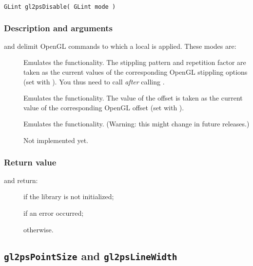 \begin{verbatim}
GLint gl2psDisable( GLint mode )
\end{verbatim}

\subsubsection{Description and arguments}

 and  delimit OpenGL commands to which a local
 is applied. These modes are:

\begin{description}
\item[] Emulates the 
  functionality. The stippling pattern and repetition factor are taken
  as the current values of the corresponding OpenGL stippling options
  (set with ). You thus need to call
   \emph{after} calling
  .
\item[] Emulates the
   functionality. The value of the offset is
  taken as the current value of the corresponding OpenGL offset (set with
  ).
\item[] Emulates the  functionality.
  (Warning: this might change in future releases.)
\item[] Not implemented yet.
\end{description}

\subsubsection{Return value}

\noindent{} and  return:
\begin{description}
\item[] if the library is not initialized;
\item[] if an error occurred;
\item[] otherwise.
\end{description}


\subsection{\texttt{gl2psPointSize} and \texttt{gl2psLineWidth}}
\label{sec:gl2psPointSize}

